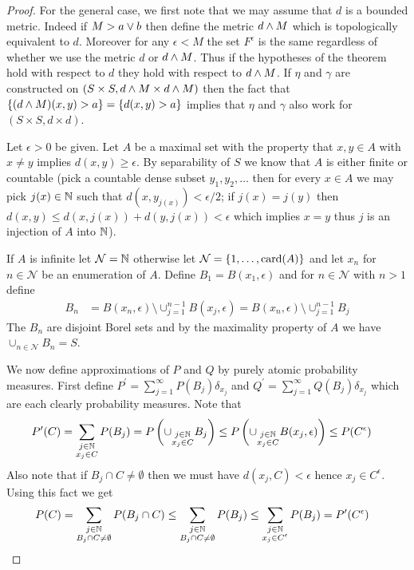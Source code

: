 \begin{proof}
For the general case, we first note that we may assume that $d$ is a bounded metric.  Indeed if $M> a \vee b$ then define the metric $d \wedge M$ which is topologically equivalent to $d$.  Moreover for any $\epsilon < M$ the set $F^\epsilon$ is the same regardless of whether we use the metric $d$ or $d \wedge M$.  
Thus if the hypotheses of the theorem hold with respect to $d$ they hold with respect to $d \wedge M$.  If $\eta$ and $\gamma$ are constructed on $(S \times S, d \wedge M \times d \wedge M)$ then the fact that $\lbrace (d \wedge M)(x,y) > a \rbrace = \lbrace d(x,y) > a \rbrace$ implies that $\eta$ and $\gamma$ also work for $(S \times S, d \times d)$.

Let $\epsilon>0$ be given.  Let $A$ be a maximal set with the property that $x,y \in A$ with $x \neq y$ implies $d(x,y) \geq \epsilon$.  By separability of $S$ we know that $A$ is either finite or countable (pick a countable dense subset $y_1, y_2, \dotsc$ then for every $x \in A$ we may pick $j(x) \in \mathbb{N}$ such that $d(x, y_{j(x)}) < \epsilon/2$; if $j(x) = j(y)$ then $d(x,y) \leq d(x, j(x)) + d(y,j(x)) < \epsilon$ which implies $x=y$ thus $j$ is an injection of $A$ into $\mathbb{N}$).  

If $A$ is infinite let $\mathcal{N} =\mathbb{N}$ otherwise let $\mathcal{N} = \lbrace 1, \dotsc, \operatorname*{card}(A) \rbrace$ and let $x_n$ for $n \in \mathcal{N}$ be an enumeration of $A$.  Define $B_1 = B(x_1, \epsilon)$ and for $n \in \mathcal{N}$ with $n > 1$ define
\begin{align*}
B_n &= B(x_n, \epsilon) \setminus \cup_{j=1}^{n-1} B(x_j, \epsilon) = B(x_n, \epsilon) \setminus \cup_{j=1}^{n-1} B_j
\end{align*} 
The $B_n$ are disjoint Borel sets and by the maximality property of $A$ we have $\cup_{n \in \mathcal{N}} B_n = S$.  

We now define approximations of $P$ and $Q$ by purely atomic probability measures.  First define $P^\prime = \sum_{j=1}^\infty P(B_j) \delta_{x_j}$ and $Q^\prime =  \sum_{j=1}^\infty Q(B_j) \delta_{x_j}$ which are each clearly probability measures.  Note that
\begin{align}\label{StrassenPlus:Ineq1}
P^\prime(C) &= \sum_{\substack{j \in \mathbb{N} \\ x_j \in C}} P(B_j) = P \left( \cup_{\substack{j \in \mathbb{N} \\ x_j \in C}} B_j \right) \leq P \left( \cup_{\substack{j \in \mathbb{N} \\ x_j \in C}} B(x_j, \epsilon) \right) \leq P(C^\epsilon)
\end{align}
Also note that if $B_j \cap C \neq \emptyset$ then we must have $d(x_j, C) < \epsilon$ hence $x_j \in C^\epsilon$.  Using this fact we get
\begin{align}\label{StrassenPlus:Ineq2}
P(C) &= \sum_{\substack{j \in \mathbb{N} \\ B_j \cap C \neq \emptyset}} P (B_j \cap C ) 
\leq \sum_{\substack{j \in \mathbb{N} \\ B_j \cap C \neq \emptyset}} P(B_j) 
\leq \sum_{\substack{j \in \mathbb{N} \\ x_j \in C^\epsilon}} P(B_j)
=P^{\prime}(C^\epsilon)
\end{align}


\end{proof}

